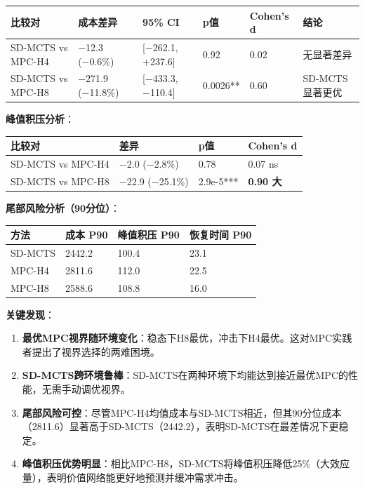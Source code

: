 \documentclass[UTF8]{ctexart}
\begin{document}
\begin{table}[h]
\centering
\begin{tabular}{p{3cm}p{3cm}p{3cm}p{1.5cm}p{2cm}p{2cm}}
\toprule
\textbf{比较对} & \textbf{成本差异} & \textbf{95\% CI} & \textbf{p值} & \textbf{Cohen's d} & \textbf{结论} \\
\midrule
SD-MCTS vs MPC-H4 & −12.3 (−0.6\%) & [−262.1, +237.6] & 0.92 & 0.02 & 无显著差异 \\
SD-MCTS vs MPC-H8 & −271.9 (−11.8\%) & [−433.3, −110.4] & 0.0026** & 0.60 & SD-MCTS显著更优 \\
\bottomrule
\end{tabular}
\end{table}

\textbf{峰值积压分析}：

\begin{table}[h]
\centering
\begin{tabular}{p{4cm}p{3.5cm}p{2cm}p{3.5cm}}
\toprule
\textbf{比较对} & \textbf{差异} & \textbf{p值} & \textbf{Cohen's d} \\
\midrule
SD-MCTS vs MPC-H4 & −2.0 (−2.8\%) & 0.78 & 0.07 ns \\
SD-MCTS vs MPC-H8 & −22.9 (−25.1\%) & 2.9e-5*** & \textbf{0.90 大} \\
\bottomrule
\end{tabular}
\end{table}

\textbf{尾部风险分析（90分位）}：

\begin{table}[h]
\centering
\begin{tabular}{p{3.5cm}p{3.5cm}p{3.5cm}p{3.5cm}}
\toprule
\textbf{方法} & \textbf{成本 P90} & \textbf{峰值积压 P90} & \textbf{恢复时间 P90} \\
\midrule
SD-MCTS & 2442.2 & 100.4 & 23.1 \\
MPC-H4 & 2811.6 & 112.0 & 22.5 \\
MPC-H8 & 2588.6 & 108.8 & 16.0 \\
\bottomrule
\end{tabular}
\end{table}

\textbf{关键发现}：

\begin{enumerate}
\def\labelenumi{\arabic{enumi}.}
\item
  \textbf{最优MPC视界随环境变化}：稳态下H8最优，冲击下H4最优。这对MPC实践者提出了视界选择的两难困境。
\item
  \textbf{SD-MCTS跨环境鲁棒}：SD-MCTS在两种环境下均能达到接近最优MPC的性能，无需手动调优视界。
\item
  \textbf{尾部风险可控}：尽管MPC-H4均值成本与SD-MCTS相近，但其90分位成本（2811.6）显著高于SD-MCTS（2442.2），表明SD-MCTS在最差情况下更稳定。
\item
  \textbf{峰值积压优势明显}：相比MPC-H8，SD-MCTS将峰值积压降低25\%（大效应量），表明价值网络能更好地预测并缓冲需求冲击。
\end{enumerate}
\end{document}

